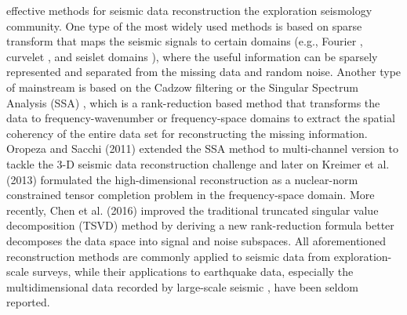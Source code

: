  effective methods for seismic data reconstruction  the exploration seismology community. One type of the most widely used methods is based on  sparse transform that maps the seismic signals to certain domains (e.g., Fourier \cite{abma2006}, curvelet \cite{yu2017mapping}, and seislet domains \cite{fomel2010seislet}), where the useful information can be sparsely represented and separated from the missing data and random noise. Another type of mainstream  is based on the Cadzow filtering or the Singular Spectrum Analysis (SSA) \cite{ssa}, which is a rank-reduction based method that transforms the data to frequency-wavenumber or frequency-space domains to extract the spatial coherency of the entire data set for reconstructing the missing information. Oropeza and Sacchi (2011) \cite{mssa} extended the SSA method to multi-channel version to tackle the 3-D seismic data reconstruction challenge and later on Kreimer et al. (2013) \cite{kreimer2013} formulated the high-dimensional reconstruction as a nuclear-norm constrained tensor completion problem in the frequency-space domain. More recently, Chen et al. (2016) \cite{yangkang2016irr5d} improved the traditional truncated singular value decomposition (TSVD) method by deriving a new rank-reduction formula better decomposes the data space into signal and noise subspaces. All aforementioned reconstruction methods are commonly applied to seismic data from exploration-scale surveys, while their applications to earthquake data, especially the multidimensional data recorded by large-scale seismic , have been seldom reported.

